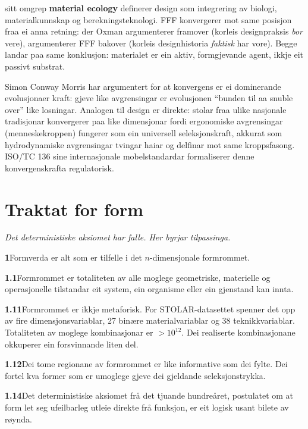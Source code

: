 \documentclass[10pt, a4paper, twocolumn]{article}
\begin{document}
\citet{oxman2016} sitt omgrep \textbf{material ecology} definerer design som integrering av biologi, materialkunnskap og berekningsteknologi. FFF konvergerer mot same posisjon fraa ei anna retning: der Oxman argumenterer framover (korleis designpraksis \emph{bor} vere), argumenterer FFF bakover (korleis designhistoria \emph{faktisk} har vore). Begge landar paa same konklusjon: materialet er ein aktiv, formgjevande agent, ikkje eit passivt substrat.

Simon Conway Morris har argumentert for at konvergens er ei dominerande evolusjonaer kraft: gjeve like avgrensingar er evolusjonen ``bunden til aa snuble over'' like losningar. Analogen til design er direkte: stolar fraa ulike nasjonale tradisjonar konvergerer paa like dimensjonar fordi ergonomiske avgrensingar (menneskekroppen) fungerer som ein universell seleksjonskraft, akkurat som hydrodynamiske avgrensingar tvingar haiar og delfinar mot same kroppsfasong. ISO/TC 136 sine internasjonale mobelstandardar formaliserer denne konvergenskrafta regulatorisk.


\section{Traktat for form}

\noindent\emph{Det deterministiske aksiomet har falle. Her byrjar tilpassinga.}

\bigskip

\noindent\textbf{1}\quad Formverda er alt som er tilfelle i det $n$-dimensjonale formrommet.

\medskip
\noindent\textbf{1.1}\quad Formrommet er totaliteten av alle moglege geometriske, materielle og operasjonelle tilstandar eit system, ein organisme eller ein gjenstand kan innta.

\medskip
\noindent\textbf{1.11}\quad Formrommet er ikkje metaforisk. For STOLAR-datasettet spenner det opp av fire dimensjonsvariablar, 27 binære materialvariablar og 38 teknikkvariablar. Totaliteten av moglege kombinasjonar er $> 10^{12}$. Dei realiserte kombinasjonane okkuperer ein forsvinnande liten del.

\medskip
\noindent\textbf{1.12}\quad Dei tome regionane av formrommet er like informative som dei fylte. Dei fortel kva former som er umoglege gjeve dei gjeldande seleksjonstrykka.

\medskip
\noindent\textbf{1.14}\quad Det deterministiske aksiomet frå det tjuande hundreåret, postulatet om at form let seg ufeilbarleg utleie direkte frå funksjon, er eit logisk usant bilete av røynda.
\end{document}
